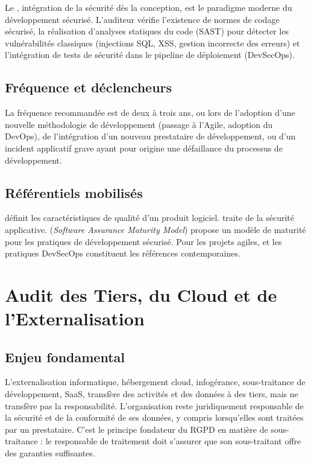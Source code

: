 Le , intégration de la sécurité dès la conception, est le paradigme moderne du développement sécurisé. L'auditeur vérifie l'existence de normes de codage sécurisé, la réalisation d'analyses statiques du code (SAST) pour détecter les vulnérabilités classiques (injections SQL, XSS, gestion incorrecte des erreurs) et l'intégration de tests de sécurité dans le pipeline de déploiement (DevSecOps).

\subsection{Fréquence et déclencheurs}

La fréquence recommandée est de deux à trois ans, ou lors de l'adoption d'une nouvelle méthodologie de développement (passage à l'Agile, adoption du DevOps), de l'intégration d'un nouveau prestataire de développement, ou d'un incident applicatif grave ayant pour origine une défaillance du processus de développement.

\subsection{Référentiels mobilisés}

 définit les caractéristiques de qualité d'un produit logiciel.  traite de la sécurité applicative.  (\textit{Software Assurance Maturity Model}) propose un modèle de maturité pour les pratiques de développement sécurisé. Pour les projets agiles,  et les pratiques DevSecOps constituent les références contemporaines.


\section{Audit des Tiers, du Cloud et de l'Externalisation}

\subsection{Enjeu fondamental}

L'externalisation informatique, hébergement cloud, infogérance, sous-traitance de développement, SaaS, transfère des activités et des données à des tiers, mais ne transfère pas la responsabilité. L'organisation reste juridiquement responsable de la sécurité et de la conformité de ses données, y compris lorsqu'elles sont traitées par un prestataire. C'est le principe fondateur du RGPD en matière de sous-traitance : le responsable de traitement doit s'assurer que son sous-traitant offre des garanties suffisantes.

